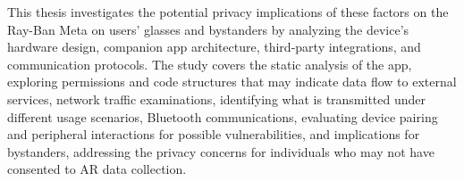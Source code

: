 This thesis investigates the potential privacy implications of these factors on the Ray-Ban Meta on users' glasses and bystanders by analyzing the device's hardware design, companion app architecture, third-party integrations, and communication protocols. The study covers the static analysis of the app, exploring permissions and code structures that may indicate data flow to external services, network traffic examinations, identifying what is transmitted under different usage scenarios, Bluetooth communications, evaluating device pairing and peripheral interactions for possible vulnerabilities, and implications for bystanders, addressing the privacy concerns for individuals who may not have consented to AR data collection.



%
%
%
%
%

